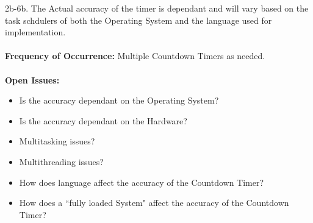 \documentclass[letterpaper]{article}
\begin{document}
2b-6b.  The Actual accuracy of the timer is dependant and
will vary based on the task schdulers of both the Operating
System and the language used for implementation.\\\\
\textbf{Frequency of Occurrence:  }Multiple Countdown Timers as
needed.\\\\
\textbf{Open Issues:  }\\
\begin{itemize}
\item Is the accuracy dependant on the Operating System?
\item Is the accuracy dependant on the Hardware?
\item Multitasking issues?
\item Multithreading issues?
\item How does language affect the accuracy of the Countdown Timer?
\item How does a ``fully loaded System" affect the accuracy
of the Countdown Timer?
\end{itemize}
\end{document}
